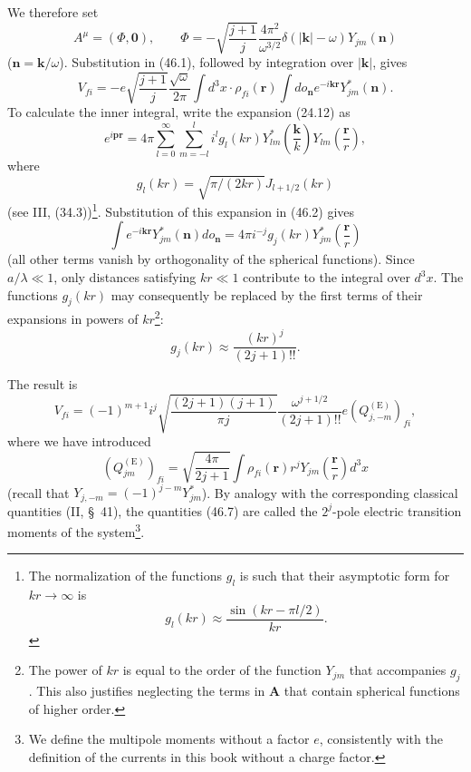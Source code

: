 We therefore set
\[
A^\mu=(\Phi,\mathbf0),
\qquad
\Phi=-\sqrt{\frac{j+1}{j}}\frac{4\pi^2}{\omega^{3/2}}\delta(|\mathbf k|-\omega)Y_{jm}(\mathbf n)
\]
($\mathbf n=\mathbf k/\omega$). Substitution in (46.1), followed by integration over $|\mathbf k|$, gives
\begin{equation}
V_{fi}=-e\sqrt{\frac{j+1}{j}}\frac{\sqrt\omega}{2\pi}
\int d^3x\cdot\rho_{fi}(\mathbf r)\int do_{\mathbf n}e^{-i\mathbf k\mathbf r}Y_{jm}^*(\mathbf n).
\tag{46.2}
\end{equation}
To calculate the inner integral, write the expansion (24.12) as
\begin{equation}
e^{i\mathbf p\mathbf r}=4\pi\sum_{l=0}^\infty\sum_{m=-l}^l
i^l g_l(kr)Y_{lm}^*\left(\frac{\mathbf k}{k}\right)
Y_{lm}\left(\frac{\mathbf r}{r}\right),
\tag{46.3}
\end{equation}
where
\begin{equation}
g_l(kr)=\sqrt{\pi/(2kr)}J_{l+1/2}(kr)
\tag{46.4}
\end{equation}
(see III, (34.3))\footnote{The normalization of the functions $g_l$ is such that their asymptotic form for $kr\to\infty$ is
\begin{equation}
g_l(kr)\approx\frac{\sin(kr-\pi l/2)}{kr}.
\tag{46.4a}
\end{equation}}. Substitution of this expansion in (46.2) gives
\[
\int e^{-i\mathbf k\mathbf r}Y_{jm}^*(\mathbf n)do_{\mathbf n}
=4\pi i^{-j}g_j(kr)Y_{jm}^*\left(\frac{\mathbf r}{r}\right)
\]
(all other terms vanish by orthogonality of the spherical functions). Since $a/\lambda\ll1$, only distances satisfying $kr\ll1$ contribute to the integral over $d^3x$. The functions $g_j(kr)$ may consequently be replaced by the first terms of their expansions in powers of $kr$\footnote{The power of $kr$ is equal to the order of the function $Y_{jm}$ that accompanies $g_j$. This also justifies neglecting the terms in $\mathbf A$ that contain spherical functions of higher order.}:
\begin{equation}
g_j(kr)\approx\frac{(kr)^j}{(2j+1)!!}.
\tag{46.5}
\end{equation}

The result is
\begin{equation}
V_{fi}=(-1)^{m+1}i^j
\sqrt{\frac{(2j+1)(j+1)}{\pi j}}
\frac{\omega^{j+1/2}}{(2j+1)!!}e(Q_{j,-m}^{(\mathrm E)})_{fi},
\tag{46.6}
\end{equation}
where we have introduced
\begin{equation}
(Q_{jm}^{(\mathrm E)})_{fi}=\sqrt{\frac{4\pi}{2j+1}}
\int\rho_{fi}(\mathbf r)r^jY_{jm}\left(\frac{\mathbf r}{r}\right)d^3x
\tag{46.7}
\end{equation}
(recall that $Y_{j,-m}=(-1)^{j-m}Y_{jm}^*$). By analogy with the corresponding classical quantities (II, \S~41), the quantities (46.7) are called the $2^j$-pole electric transition moments of the system\footnote{We define the multipole moments without a factor $e$, consistently with the definition of the currents in this book without a charge factor.}.

